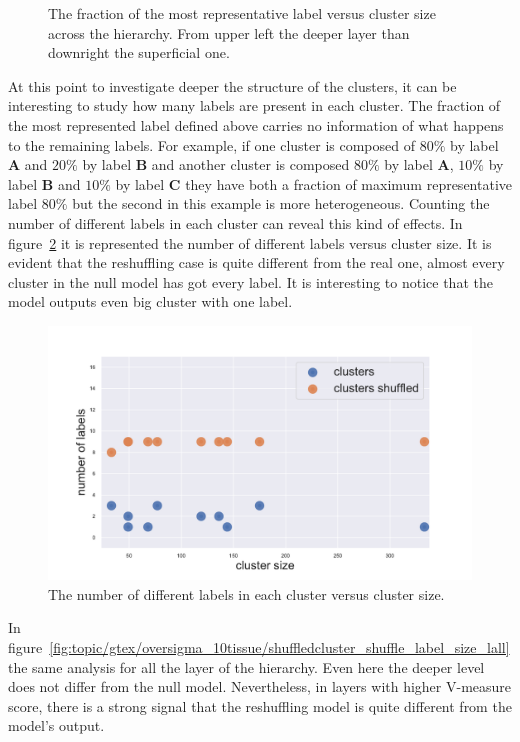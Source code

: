 \begin{figure}[htb!]
\begin{minipage}{0.45\textwidth}
	\end{minipage}
	\caption{The fraction of the most representative label versus cluster size across the hierarchy. From upper left the deeper layer than downright the superficial one.}
	\label{fig:topic/gtex/oversigma_10tissue/shuffledclusterhomosize_l*}
\end{figure}
\FloatBarrier
At this point to investigate deeper the structure of the clusters, it can be interesting to study how many labels are present in each cluster. The fraction of the most represented label defined above carries no information of what happens to the remaining labels. For example, if one cluster is composed of $80\%$ by label \textbf{A} and $20\%$ by label \textbf{B} and another cluster is composed $80\%$ by label \textbf{A}, $10\%$ by label \textbf{B} and $10\%$ by label \textbf{C} they have both a fraction of maximum representative label $80\%$ but the second in this example is more heterogeneous. Counting the number of different labels in each cluster can reveal this kind of effects. In figure~\ref{fig:topic/gtex/oversigma_10tissue/shuffledcluster_shuffle_label_size_l3_primary_site} it is represented the number of different labels versus cluster size. It is evident that the reshuffling case is quite different from the real one, almost every cluster in the null model has got every label. It is interesting to notice that the model outputs even big cluster with one label.
\begin{figure}[htb!]
    \centering
    \includegraphics[width=0.9\linewidth]{pictures/topic/gtex/oversigma_10tissue/shuffledcluster_shuffle_label_size_l3_primary_site.pdf}
    \caption{The number of different labels in each cluster versus cluster size.}
    \label{fig:topic/gtex/oversigma_10tissue/shuffledcluster_shuffle_label_size_l3_primary_site}
\end{figure}
In figure~\ref{fig:topic/gtex/oversigma_10tissue/shuffledcluster_shuffle_label_size_lall} the same analysis for all the layer of the hierarchy. Even here the deeper level does not differ from the null model. Nevertheless, in layers with higher V-measure score, there is a strong signal that the reshuffling model is quite different from the model's output.
